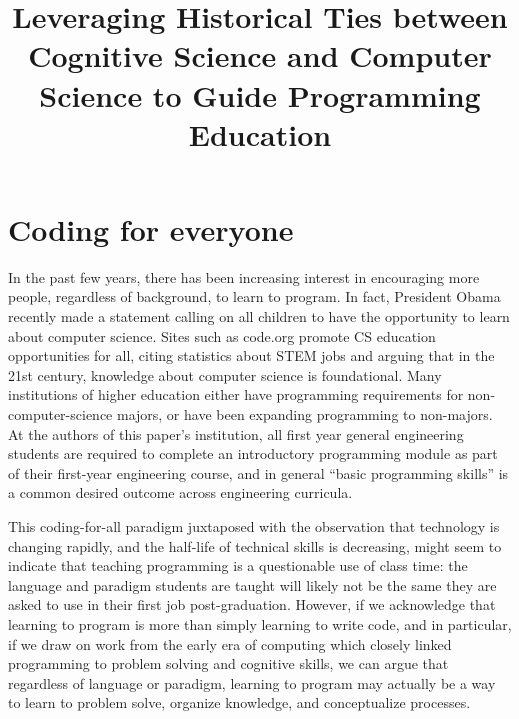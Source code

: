 \documentclass[12pt]{article}
\title{\large \textbf{Leveraging Historical Ties between Cognitive Science and
  Computer Science to Guide Programming Education}}
\author{}
\date{}
\begin{document}
\raggedright
\maketitle
\thispagestyle{empty}
\pagestyle{empty}

\section*{Coding for everyone}
In the past few years, there has been increasing interest in
encouraging more people, regardless of background, to learn to
program. In fact, President Obama recently made a statement calling on
all children to have the opportunity to learn about computer
science\autocite{whitehouse_computer_2016}. Sites such as code.org
promote CS education opportunities for all, citing statistics about
STEM jobs and arguing that in the 21st century, knowledge about
computer science is foundational\autocite{code.org_every_2016}. Many
institutions of higher education either have programming requirements
for non-computer-science majors, or have been expanding programming to
non-majors\autocite{rich_cs1_2004,forte_motivation_2005,guzdial_design_2005}. At
the authors of this paper's institution, all first year general
engineering students are required to complete an introductory
programming module as part of their first-year engineering course, and
in general ``basic programming skills'' is a common desired outcome
across engineering curricula\autocite{reid_classification_2014}.

This coding-for-all paradigm juxtaposed with the observation that
technology is changing rapidly, and the half-life of technical skills
is decreasing\autocite{nae_educating_2004}, might seem to indicate that
teaching programming is a questionable use of class time: the language
and paradigm students are taught will likely not be the same they are
asked to use in their first job post-graduation. However, if we
acknowledge that learning to program is more than simply learning to
write code, and in particular, if we draw on work from the early era of
computing which closely linked programming to problem solving and
cognitive skills, we can argue that regardless of language or
paradigm, learning to program may actually be a way to learn to
problem solve, organize knowledge, and conceptualize processes.
\end{document}
